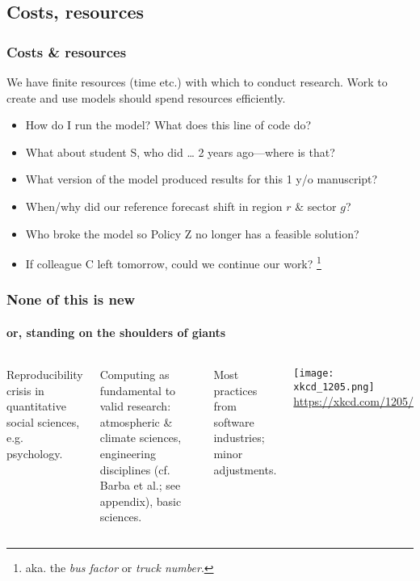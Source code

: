 \documentclass[12pt,aspectratio=169]{beamer}
\begin{document}
\subsection{Costs, resources}
\begin{frame}
\frametitle{Costs \& resources}

We have finite resources (time etc.) with which to conduct research.
Work to create and use models should spend resources efficiently.

\smallskip
{}
\begin{itemize}
  \item How do I run the model? What does this line of code do?
  \item What about student S, who did … 2 years ago—where is that?
  \item What version of the model produced results for this 1 y/o manuscript?
\end{itemize}

\begin{itemize}
  \item When/why did our reference forecast shift in region $r$ \& sector $g$?
  \item Who broke the model so Policy Z no longer has a feasible solution?
\end{itemize}

\begin{itemize}
  \item If colleague C left tomorrow, could we continue our work?%
  \footnote{aka. the \emph{bus factor} or \emph{truck number}.}
\end{itemize}

\end{frame}


\begin{frame}
\frametitle{None of this is new}
\framesubtitle{or, standing on the shoulders of giants}

\begin{columns}[T]
\column{0.45\paperwidth}
Reproducibility crisis in quantitative social sciences, e.g. psychology.

\bigskip
Computing as fundamental to valid research: atmospheric \& climate sciences, engineering disciplines (cf. Barba et al.; see appendix), basic sciences.

\bigskip
Most practices from software industries; minor adjustments.

\column{0.5\paperwidth}
\centering
\texttt{[image: xkcd\_1205.png]}
\url{https://xkcd.com/1205/}

\end{columns}

\end{frame}
\end{document}
